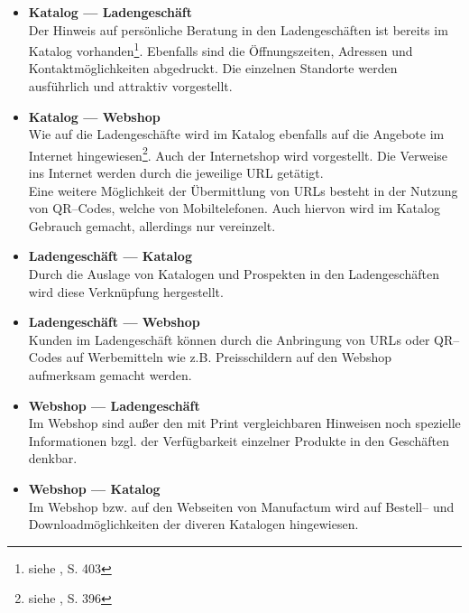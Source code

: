 \begin{itemize}
\item{\textbf{Katalog --- Ladengeschäft}\\
Der Hinweis auf persönliche Beratung in den Ladengeschäften ist bereits im Katalog vorhanden\footnote{siehe \cite{manufactum}, S. 403}. Ebenfalls sind die Öffnungszeiten, Adressen und Kontaktmöglichkeiten abgedruckt. Die einzelnen Standorte werden ausführlich und attraktiv vorgestellt.
}
\item{\textbf{Katalog --- Webshop}\\
Wie auf die Ladengeschäfte wird im Katalog ebenfalls auf die Angebote im Internet hingewiesen\footnote{siehe \cite{manufactum}, S. 396}. Auch der Internetshop wird vorgestellt. Die Verweise ins Internet werden durch die jeweilige \ac{URL} getätigt.\\
Eine weitere Möglichkeit der Übermittlung von URLs besteht in der Nutzung von QR--Codes, welche von Mobiltelefonen. Auch hiervon wird im Katalog Gebrauch gemacht, allerdings nur vereinzelt.
}
\item{\textbf{Ladengeschäft --- Katalog}\\
Durch die Auslage von Katalogen und Prospekten in den Ladengeschäften wird diese Verknüpfung hergestellt.
}
\item{\textbf{Ladengeschäft --- Webshop}\\
Kunden im Ladengeschäft können durch die Anbringung von \ac{URL}s oder QR--Codes auf Werbemitteln wie z.B. Preisschildern auf den Webshop aufmerksam gemacht werden.
}
\item{\textbf{Webshop --- Ladengeschäft}\\
Im Webshop sind außer den mit Print vergleichbaren Hinweisen noch spezielle Informationen bzgl. der Verfügbarkeit einzelner Produkte in den Geschäften denkbar. 
}
\item{\textbf{Webshop --- Katalog}\\
Im Webshop bzw. auf den Webseiten von Manufactum wird auf Bestell-- und Downloadmöglichkeiten der diveren Katalogen hingewiesen.
}
\end{itemize}
